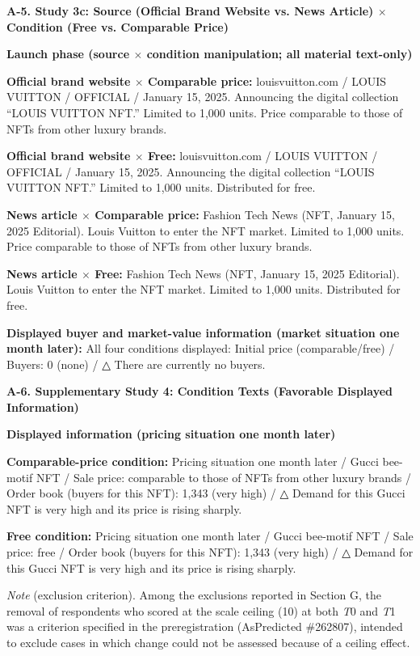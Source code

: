 \documentclass[12pt, a4paper]{article}
\makeatletter
\newcommand{\SIAnchorHeading}[2]{\clearpage\noindent \hypertarget{#1}{{\large\bfseries #2}}\par\smallskip\@afterindentfalse\@afterheading}
\makeatother
\begin{document}
\SIAnchorHeading{si:a5}{A-5. Study 3c: Source (Official Brand Website vs. News Article) $\times$ Condition (Free vs. Comparable Price)}

\noindent \textbf{Launch phase (source $\times$ condition manipulation; all material text-only)}

\noindent \textbf{Official brand website $\times$ Comparable price:} louisvuitton.com / LOUIS VUITTON / OFFICIAL / January 15, 2025. Announcing the digital collection ``LOUIS VUITTON NFT.'' Limited to 1,000 units. Price comparable to those of NFTs from other luxury brands.

\noindent \textbf{Official brand website $\times$ Free:} louisvuitton.com / LOUIS VUITTON / OFFICIAL / January 15, 2025. Announcing the digital collection ``LOUIS VUITTON NFT.'' Limited to 1,000 units. Distributed for free.

\noindent \textbf{News article $\times$ Comparable price:} Fashion Tech News (NFT, January 15, 2025 \textbar{} Editorial). Louis Vuitton to enter the NFT market. Limited to 1,000 units. Price comparable to those of NFTs from other luxury brands.

\noindent \textbf{News article $\times$ Free:} Fashion Tech News (NFT, January 15, 2025 \textbar{} Editorial). Louis Vuitton to enter the NFT market. Limited to 1,000 units. Distributed for free.

\noindent \textbf{Displayed buyer and market-value information (market situation one month later):} All four conditions displayed: Initial price (comparable/free) / Buyers: 0 (none) / △ There are currently no buyers.

\SIAnchorHeading{si:a6}{A-6. Supplementary Study 4: Condition Texts (Favorable Displayed Information)}

\noindent \textbf{Displayed information (pricing situation one month later)}

\noindent \textbf{Comparable-price condition:} Pricing situation one month later / Gucci bee-motif NFT / Sale price: comparable to those of NFTs from other luxury brands / Order book (buyers for this NFT): 1,343 (very high) / △ Demand for this Gucci NFT is very high and its price is rising sharply.

\noindent \textbf{Free condition:} Pricing situation one month later / Gucci bee-motif NFT / Sale price: free / Order book (buyers for this NFT): 1,343 (very high) / △ Demand for this Gucci NFT is very high and its price is rising sharply.

\emph{Note} (exclusion criterion). Among the exclusions reported in Section G, the removal of respondents who scored at the scale ceiling (10) at both \emph{T}0 and \emph{T}1 was a criterion specified in the preregistration (AsPredicted \#262807), intended to exclude cases in which change could not be assessed because of a ceiling effect.
\end{document}
